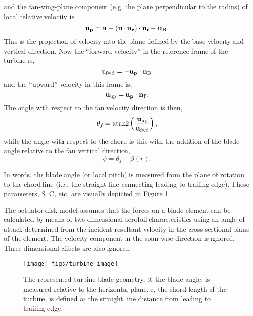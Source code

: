 and the fan-wing-plane component (e.g. the plane perpendicular to the 
radius) of local relative velocity is
\begin{equation}
{\bf u_p} = {\bf u} - ({\bf u}\cdot {\bf n_r})\cdot {\bf n_r} - {\bf u_B}. 
\end{equation}
This is the projection of velocity into the plane defined by the base
velocity and vertical direction. Now the ``forward velocity'' in the
reference frame of the turbine is,  
\begin{equation}
{\bf u_{\text{fwd}}}= -{\bf u_p} \cdot {\bf n_B}
\end{equation}
and the ``upward'' velocity in this frame is, 
\begin{equation}
{\bf u_{\text{up}}} = {\bf u_p} \cdot {\bf n_f}. 
\end{equation}
The angle with respect to the fan velocity direction is then, 
\begin{equation}
 \theta_f = \text{atan2}\left(\frac{{\bf u_{\text{up}}}}{{\bf u_{\text{fwd}}}}\right),
  \label{eq:fan_direction}
\end{equation}
while the angle with respect to the chord is this with the addition of
the blade angle relative to the fan vertical direction, 
\begin{equation}
 \phi = \theta_f + \beta(r).
\end{equation}

In words, the blade angle (or local pitch) is measured from the plane of
rotation to the chord line (i.e., the straight line connecting leading
to trailing edge). These parameters, $\beta$, C, etc. are visually
depicted in Figure \ref{fig:turbine_image}.  

The actuator disk model assumes that the forces on a blade
element can be calculated by means of two-dimensional aerofoil
characteristics using an angle of attack determined from the incident
resultant velocity in the cross-sectional plane of the element. The
velocity component in the span-wise direction is
ignored. Three-dimensional effects are also
ignored\cite{burton2001wind}.  

  \begin{figure}[!htb]
    \begin{center}
     \texttt{[image: figs/turbine\_image]}
     \caption{The represented turbine blade
     geometry. $\beta$, the blade angle, is measured relative to the
     horizontal plane. c, the chord length of the turbine, is defined as
     the straight line distance from leading to trailing edge. } 
     \label{fig:turbine_image}
    \end{center}
  \end{figure}

